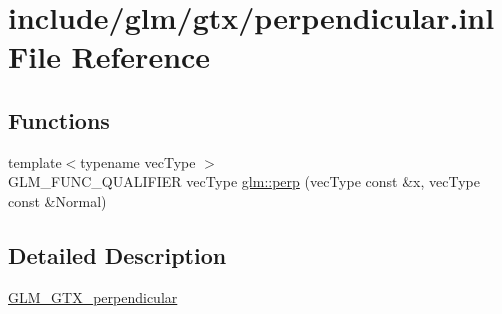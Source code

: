 \hypertarget{perpendicular_8inl}{}\section{include/glm/gtx/perpendicular.inl File Reference}
\label{perpendicular_8inl}
\subsection*{Functions}
\begin{DoxyCompactItemize}
\item 
{\footnotesize template$<$typename vec\+Type $>$ }\\G\+L\+M\+\_\+\+F\+U\+N\+C\+\_\+\+Q\+U\+A\+L\+I\+F\+I\+ER vec\+Type \hyperlink{group__gtx__perpendicular_ga41f8c73da9798a18e6b1e32f1e301f07}{glm\+::perp} (vec\+Type const \&x, vec\+Type const \&Normal)
\end{DoxyCompactItemize}


\subsection{Detailed Description}
\hyperlink{group__gtx__perpendicular}{G\+L\+M\+\_\+\+G\+T\+X\+\_\+perpendicular} 